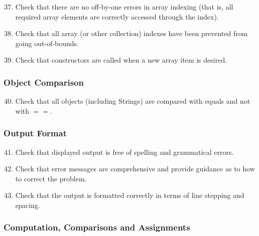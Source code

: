 \begin{enumerate}
\setcounter{enumi}{36}

\item Check that there are no off-by-one errors in array indexing (that is, all required array elements are correctly accessed through the index).

\item Check that all array (or other collection) indexes have been prevented from going out-of-bounds.

\item Check that constructors are called when a new array item is desired.

\end{enumerate}

\subsubsection{Object Comparison} \label{sssec:obj-comp}

\begin{enumerate}
\setcounter{enumi}{39}

\item Check that all objects (including Strings) are compared with equals and not with \texttt{$==$}.

\end{enumerate}

\subsubsection{Output Format} \label{sssec:output}

\begin{enumerate}
\setcounter{enumi}{40}

\item Check that displayed output is free of spelling and grammatical errors.

\item Check that error messages are comprehensive and provide guidance as to how to correct the problem.

\item Check that the output is formatted correctly in terms of line stepping and spacing.

\end{enumerate}

\subsubsection{Computation, Comparisons and Assignments} \label{sssec:cca}


